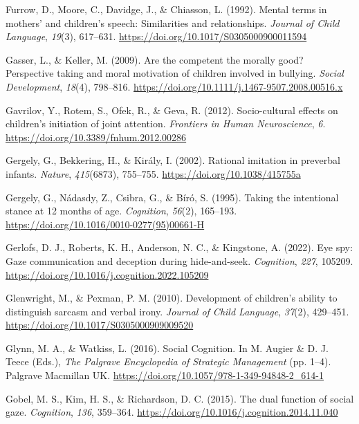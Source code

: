 \documentclass[
]{scrbook}
\newlength{\cslhangindent}
\newenvironment{CSLReferences}[2] %
 {\begin{list}{}{%
  \setlength{\itemindent}{0pt}
  \setlength{\leftmargin}{0pt}
  \setlength{\parsep}{0pt}
  \ifodd #1
   \setlength{\leftmargin}{\cslhangindent}
   \setlength{\itemindent}{-1\cslhangindent}
  \fi
  \setlength{\itemsep}{#2\baselineskip}}}
 {\end{list}}
\begin{document}
\begin{CSLReferences}{1}{0}
Furrow, D., Moore, C., Davidge, J., \& Chiasson, L. (1992). Mental terms in mothers' and children's speech: {Similarities} and relationships. \emph{Journal of Child Language}, \emph{19}(3), 617--631. \url{https://doi.org/10.1017/S0305000900011594}

Gasser, L., \& Keller, M. (2009). Are the competent the morally good? {Perspective} taking and moral motivation of children involved in bullying. \emph{Social Development}, \emph{18}(4), 798--816. \url{https://doi.org/10.1111/j.1467-9507.2008.00516.x}

Gavrilov, Y., Rotem, S., Ofek, R., \& Geva, R. (2012). Socio-cultural effects on children's initiation of joint attention. \emph{Frontiers in Human Neuroscience}, \emph{6}. \url{https://doi.org/10.3389/fnhum.2012.00286}

Gergely, G., Bekkering, H., \& Király, I. (2002). Rational imitation in preverbal infants. \emph{Nature}, \emph{415}(6873), 755--755. \url{https://doi.org/10.1038/415755a}

Gergely, G., Nádasdy, Z., Csibra, G., \& Bíró, S. (1995). Taking the intentional stance at 12 months of age. \emph{Cognition}, \emph{56}(2), 165--193. \url{https://doi.org/10.1016/0010-0277(95)00661-H}

Gerlofs, D. J., Roberts, K. H., Anderson, N. C., \& Kingstone, A. (2022). Eye spy: {Gaze} communication and deception during hide-and-seek. \emph{Cognition}, \emph{227}, 105209. \url{https://doi.org/10.1016/j.cognition.2022.105209}

Glenwright, M., \& Pexman, P. M. (2010). Development of children's ability to distinguish sarcasm and verbal irony. \emph{Journal of Child Language}, \emph{37}(2), 429--451. \url{https://doi.org/10.1017/S0305000909009520}

Glynn, M. A., \& Watkiss, L. (2016). Social {Cognition}. In M. Augier \& D. J. Teece (Eds.), \emph{The {Palgrave Encyclopedia} of {Strategic Management}} (pp. 1--4). Palgrave Macmillan UK. \url{https://doi.org/10.1057/978-1-349-94848-2_614-1}

Gobel, M. S., Kim, H. S., \& Richardson, D. C. (2015). The dual function of social gaze. \emph{Cognition}, \emph{136}, 359--364. \url{https://doi.org/10.1016/j.cognition.2014.11.040}


\end{CSLReferences}
\end{document}
